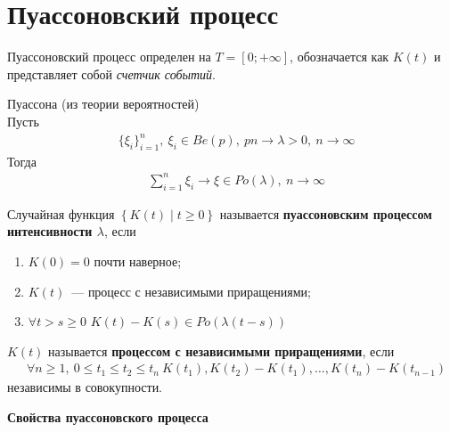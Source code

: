 \section{Пуассоновский процесс}
Пуассоновский процесс определен на $T = [0; +\infty]$, обозначается как $K(t)$ и
представляет собой \textit{счетчик событий}.
\begin{theorem} Пуассона (из теории вероятностей)
    \\
    Пусть
    \begin{align*}
      & \{\xi_i\}_{i=1}^n, \ \xi_i \in Be(p), \ pn \to \lambda > 0, \ n \to \infty
    \end{align*}
    Тогда
    \begin{align*}
      & \sum_{i=1}^n\xi_i \to \xi \in Po(\lambda), \ n \to \infty
    \end{align*}    
\end{theorem}
\begin{Def}
    Случайная функция $\left\{ K(t) \mid t \geq 0 \right\}$ называется
    \textbf{пуассоновским процессом интенсивности $\lambda$}, если
    \begin{enumerate}
        \item $K(0) = 0$ почти наверное;
        \item $K(t)$~--- процесс с независимыми приращениями;
        \item $\forall t > s \geq 0$ $K(t) - K(s) \in Po(\lambda(t-s))$
    \end{enumerate}
\end{Def}
\begin{Def}
    $K(t)$ называется \textbf{процессом с независимыми приращениями}, если
    \begin{align*}
      & \forall n \geq 1, \ 0 \leq t_1 \leq t_2 \leq t_n \ K(t_1), K(t_2) - K(t_1), \dots, K(t_n) - K(t_{n-1})
    \end{align*}
    независимы в совокупности.
\end{Def}
\textbf{Свойства пуассоновского процесса}
